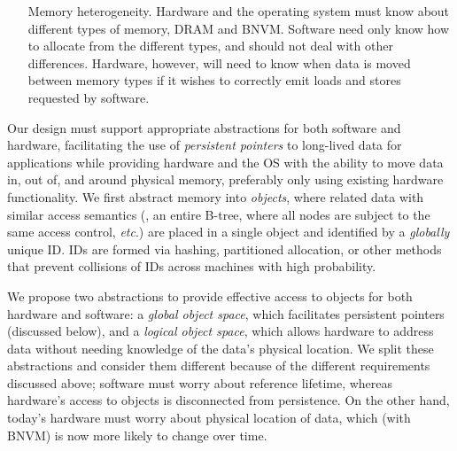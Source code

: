 {\begin{enumerate}
            Hardware need only know
            how to access data in memory
            for a single operation. In contrast, software must have longer-term mappings, and must
            be able to support data shared between threads, potentially mapped into the threads
            in different places.
        \item[Memory heterogeneity.] Hardware and the operating system must know about different
            types of memory, \eg DRAM and BNVM.
            Software need only know how to allocate
            from the different types, and should not deal with other differences. Hardware, however,
            will need to know when data is moved between memory types if it wishes to correctly emit loads and stores
            requested by software.
    \end{enumerate}

    Our design must support appropriate abstractions for both software and hardware, facilitating the
    use of \emph{persistent pointers} to long-lived data for applications while providing hardware and
    the OS with the ability to move data in, out of, and around physical memory, preferably only using
    existing hardware functionality. We first abstract memory into \emph{objects},
    where related data with similar access semantics (\eg, an entire B-tree, where all nodes are subject
    to the same access control, \emph{etc}.) are placed in a single object and identified by
    a \emph{globally} unique ID. IDs are formed via hashing, partitioned allocation, or other methods that prevent collisions
    of IDs across machines with high probability.

    We propose two abstractions to provide effective access to objects for both hardware and software:
    a \emph{global object space}, which facilitates persistent pointers (discussed below), and a
    \emph{logical object space}, which allows hardware to address data without needing knowledge of the
    data's physical location. We split these abstractions and consider them different because of the
    different requirements discussed above; software must worry about reference lifetime, whereas
    hardware's access to objects is disconnected from persistence. On the other hand, today's hardware
    must worry about physical location of data, which (with BNVM) is now more
    likely to change over time.
}

